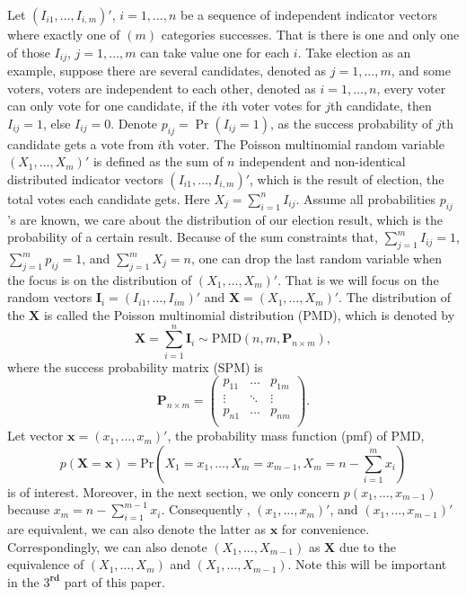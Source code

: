 \documentclass[12pt]{article}
\newcommand{\Xmat}{\mathbf{X}}
\newcommand{\Pmat}{\mathbf{P}}
\newcommand{\PMD}{\textrm{PMD}}
\begin{document}
Let $(I_{i1}, \ldots, I_{i,m})'$, $i = 1,\dots,n$ be a sequence of independent indicator vectors where exactly one of $(m)$ categories successes. That is there is one and only one of those $I_{ij}$, $j=1,\ldots, m$ can take value one for each $i$. Take election as an example, suppose there are several candidates, denoted as $j = 1,\dots,m$, and some voters, voters are independent to each other, denoted as $i = 1,\dots,n$, every voter can only vote for one candidate, if the $i$th voter votes for $j$th candidate, then $I_{ij} = 1$, else $I_{ij} = 0$.  Denote $p_{ij} = \Pr(I_{ij} = 1)$, as the success probability of $j$th candidate gets a vote from $i$th voter. The Poisson multinomial random variable $(X_1, \dots, X_m)' $ is defined as the sum of $n$ independent and non-identical distributed indicator vectors $(I_{i1}, \ldots, I_{i,m})'$, which is the result of election, the total votes each candidate gets. Here $X_j=\sum_{i=1}^{n}I_{ij}$. Assume all probabilities $p_{ij}$'s are known, we care about the distribution of our election result, which is the probability of a certain result. Because of the sum constraints that, $\sum_{j=1}^{m} I_{ij}= 1$, $\sum_{j=1}^{m} p_{ij}= 1$, and $\sum_{j=1}^{m} X_{j}= n$, one can drop the last random variable when the focus is on the distribution of $(X_1, \ldots, X_m)'$. That is we will focus on the random vectors $\boldsymbol{I}_i=(I_{i1}, \ldots, I_{im})'$ and $\Xmat=(X_1, \ldots, X_m)'$. The distribution of the $\Xmat$ is called the Poisson multinomial distribution (PMD), which is denoted by
$$\Xmat  = \sum_{i = 1}^n \boldsymbol{I}_i \sim \PMD(n,m,\Pmat_{n\times m}),$$
where the success probability matrix (SPM) is
\begin{equation*}
\Pmat_{n \times m} = \begin{pmatrix}
p_{11} &  \dots & p_{1m} \\
\vdots & \ddots & \vdots \\
p_{n1} &  \dots & p_{nm} \\
\end{pmatrix}.
\end{equation*}
Let vector $\boldsymbol{x} = (x_1,\dots,x_m)'$, the probability mass function (pmf) of PMD,
$$p(\Xmat=\boldsymbol{x}) = \text{Pr} \left( X_1 = x_1, \dots, X_m = x_{m-1}, X_{m} = n-\sum_{i=1}^{m}x_i \right)$$
is of interest. Moreover, in the next section, we only concern $p(x_1, \dots, x_{m-1})$ because $x_{m} = n-\sum_{i=1}^{m-1}x_i $. Consequently , $(x_{1},\dots,x_m)'$, and $(x_{1},\dots,x_{m-1})'$ are equivalent, we can also denote the latter as $\boldsymbol{x}$ for convenience. Correspondingly, we can also denote $(X_1,\dots,X_{m-1})$ as $\Xmat$ due to the equivalence of  $(X_1,\dots,X_m)$ and $(X_1,\dots,X_{m-1})$. Note this will be  important in the $3^{\textbf{rd}}$ part of this paper.\\
\end{document}
